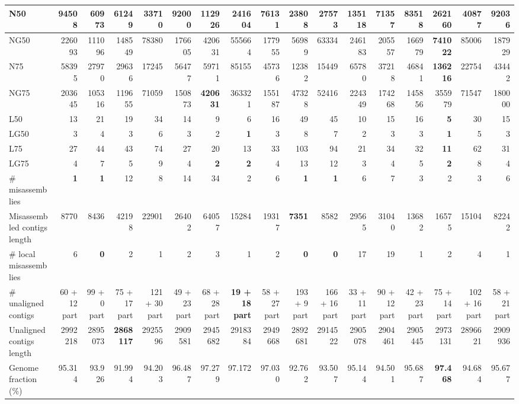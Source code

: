\documentclass[12pt,a4paper]{article}
\begin{document}
\begin{table}[ht]
\begin{center}
\begin{tabular}{|l*{16}{|r}|}
N50 & 94508 & 60973 & 61249 & 33710 & 92000 & 112926 & 241604 & 76131 & 23808 & 27573 & 135118 & 71357 & 83518 & {\bf 262160} & 40877 & 92036 \\ \hline
NG50 & 226093 & 111096 & 148549 & 78380 & 176605 & 420631 & 555664 & 177955 & 56989 & 63334 & 246183 & 205557 & 166979 & {\bf 741022} & 85006 & 187929 \\ \hline
N75 & 58395 & 27970 & 29636 & 17245 & 56477 & 59711 & 85155 & 45736 & 12382 & 15449 & 65780 & 37218 & 46841 & {\bf 136216} & 22754 & 43442 \\ \hline
NG75 & 203645 & 105316 & 119655 & 71059 & 150873 & {\bf 420631} & 363321 & 155187 & 47328 & 52416 & 224349 & 174268 & 145856 & 355979 & 71547 & 180000 \\ \hline
L50 & 13 & 21 & 19 & 34 & 14 & 9 & 6 & 16 & 49 & 45 & 10 & 15 & 16 & {\bf 5} & 30 & 15 \\ \hline
LG50 & 3 & 4 & 3 & 6 & 3 & 2 & {\bf 1} & 3 & 8 & 7 & 2 & 3 & 3 & {\bf 1} & 5 & 3 \\ \hline
L75 & 27 & 44 & 43 & 74 & 27 & 20 & 13 & 33 & 103 & 94 & 21 & 34 & 32 & {\bf 11} & 62 & 31 \\ \hline
LG75 & 4 & 7 & 5 & 9 & 4 & {\bf 2} & {\bf 2} & 4 & 13 & 12 & 3 & 4 & 5 & {\bf 2} & 8 & 4 \\ \hline
\# misassemblies & {\bf 1} & {\bf 1} & 12 & 8 & 14 & 34 & 2 & 6 & {\bf 1} & {\bf 1} & 6 & 7 & 3 & 2 & 3 & 6 \\ \hline
Misassembled contigs length & 8770 & 8436 & 42198 & 22901 & 26402 & 64057 & 15284 & 19317 & {\bf 7351} & 8582 & 29565 & 31040 & 13682 & 16575 & 15104 & 82242 \\ \hline
\# local misassemblies & 6 & {\bf 0} & 2 & 1 & 2 & 3 & 1 & 2 & {\bf 0} & {\bf 0} & 17 & 19 & 1 & 2 & 4 & 1 \\ \hline
\# unaligned contigs & 60 + 12 part & 99 + 0 part & 75 + 17 part & 121 + 30 part & 49 + 23 part & 68 + 28 part & {\bf 19 + 18 part} & 58 + 27 part & 193 + 9 part & 166 + 16 part & 33 + 11 part & 90 + 12 part & 42 + 23 part & 75 + 14 part & 102 + 16 part & 58 + 21 part \\ \hline
Unaligned contigs length & 2992218 & 2895073 & {\bf 2868117} & 2925596 & 2909581 & 2945682 & 2918384 & 2949668 & 2892681 & 2914522 & 2905078 & 2904461 & 2905445 & 2973131 & 2896621 & 2909936 \\ \hline
Genome fraction (\%) & 95.314 & 93.926 & 91.994 & 94.203 & 96.487 & 97.279 & 97.172 & 97.030 & 92.762 & 93.507 & 95.144 & 94.501 & 95.687 & {\bf 97.468} & 94.684 & 95.677 \\ \hline

\end{tabular}
\end{center}
\end{table}
\end{document}
